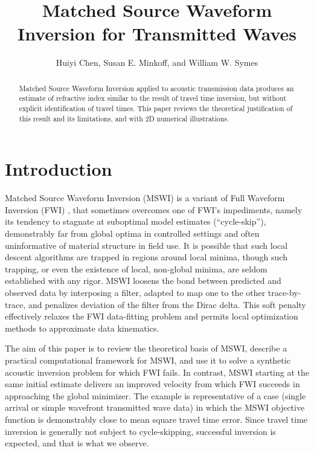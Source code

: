 \title{Matched Source Waveform Inversion for Transmitted Waves}
\author{Huiyi Chen, Susan E. Minkoff, and William W. Symes}



\maketitle
\parskip 12pt

\begin{abstract}
Matched Source Waveform Inversion applied to acoustic transmission data
produces an estimate of refractive index similar to the result of
travel time inversion, but without explicit identification of travel
times. This paper reviews the theoretical justification of this result
and its limitations, and with 2D numerical illustrations. 
\end{abstract}
\setlength{\parindent}{0cm}

\section{Introduction}
Matched Source Waveform Inversion (MSWI) is a variant of Full Waveform
Inversion (FWI) \cite[]{VirieuxOperto:09}, that sometimes overcomes
one of FWI's impediments, namely its tendency to stagnate at
suboptimal model estimates (``cycle-skip''), demonstrably far from global optima in
controlled settings and often uninformative of material structure in
field use. It is possible that such local descent algorithms are
trapped in regions around local minima, though such trapping, or even
the existence of local, non-global minima, are seldom established with
any rigor. MSWI
loosens the bond between predicted and observed data by interposing a
filter, adapted to map one to the other trace-by-trace, and penalizes
deviation of the filter from the Dirac delta. This soft penalty
effectively relaxes the FWI data-fitting problem and permits local
optimization methods to approximate data kinematics.

The aim of this paper is to review the theoretical basis of MSWI,
describe a practical computational framework for MSWI, and use it to
solve a synthetic acoustic inversion problem for which FWI fails. In
contrast, MSWI starting at the same initial estimate delivers an
improved velocity from which FWI succeeds in approaching the global
minimizer. The example is representative of a case (single arrival or
simple wavefront transmitted wave data) in which the MSWI objective
function is demonstrably close to mean square travel time error. Since
travel time inversion is generally not subject to cycle-skipping,
successful inversion is expected, and that is what we observe.

